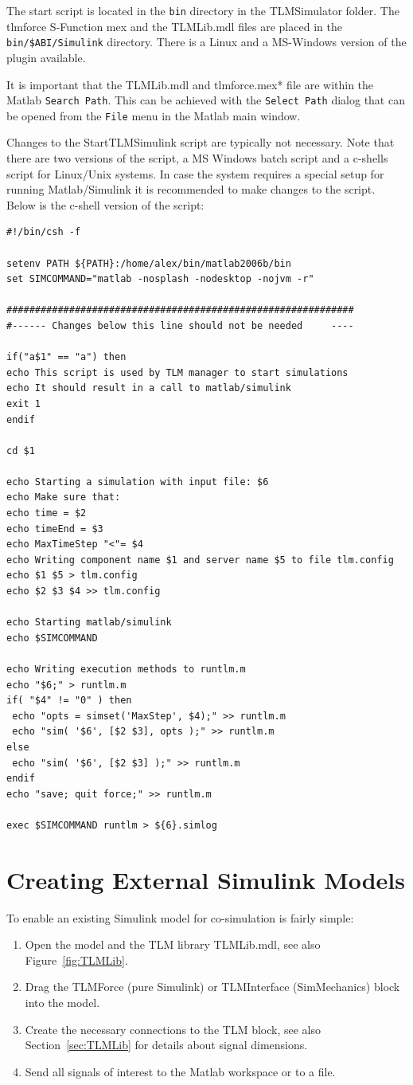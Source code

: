 The start script is located in the {\tt bin} directory in the TLMSimulator folder. 
The tlmforce S-Function mex and the TLMLib.mdl files are placed in the {\tt bin/\$ABI/Simulink} directory. 
There is a Linux and a MS-Windows version of the plugin available.

It is important that the TLMLib.mdl and tlmforce.mex* file are within the Matlab {\tt Search Path}. 
This can be achieved with the {\tt Select Path} dialog that can be opened from the {\tt File} menu in the Matlab main window.

Changes to the StartTLMSimulink script are typically not necessary. 
Note that there are two versions of the script, a MS Windows batch script and a c-shells script for Linux/Unix
systems. 
In case the system requires a special setup for running Matlab/Simulink it is recommended to make changes to the script. 
Below is the c-shell version of the script:
\begin{verbatim}
#!/bin/csh -f

setenv PATH ${PATH}:/home/alex/bin/matlab2006b/bin
set SIMCOMMAND="matlab -nosplash -nodesktop -nojvm -r"

#############################################################
#------ Changes below this line should not be needed     ----

if("a$1" == "a") then
echo This script is used by TLM manager to start simulations
echo It should result in a call to matlab/simulink
exit 1
endif

cd $1

echo Starting a simulation with input file: $6
echo Make sure that:
echo time = $2
echo timeEnd = $3
echo MaxTimeStep "<"= $4
echo Writing component name $1 and server name $5 to file tlm.config
echo $1 $5 > tlm.config
echo $2 $3 $4 >> tlm.config

echo Starting matlab/simulink
echo $SIMCOMMAND

echo Writing execution methods to runtlm.m
echo "$6;" > runtlm.m
if( "$4" != "0" ) then
 echo "opts = simset('MaxStep', $4);" >> runtlm.m
 echo "sim( '$6', [$2 $3], opts );" >> runtlm.m
else
 echo "sim( '$6', [$2 $3] );" >> runtlm.m
endif
echo "save; quit force;" >> runtlm.m

exec $SIMCOMMAND runtlm > ${6}.simlog
\end{verbatim}


\section{Creating External Simulink Models}
To enable an existing Simulink model for co-simulation is fairly simple:
\begin{enumerate}
\item Open the model and the TLM library TLMLib.mdl, see also Figure~\ref{fig:TLMLib}.
\item Drag the TLMForce (pure Simulink) or TLMInterface (SimMechanics) block into the model.
\item Create the necessary connections to the TLM block, see also Section~\ref{sec:TLMLib} for details about signal dimensions.
\item Send all signals of interest to the Matlab workspace or to a file.
\end{enumerate}

